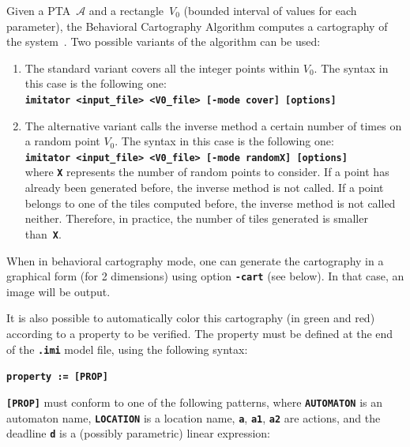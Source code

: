 \documentclass[a4paper,11pt]{report}
\newcommand{\A}{\mathcal{A}}
\newcommand{\imitatorExec}{\code{imitator}}
\newcommand{\code}[1]{\textbf{\texttt{#1}}}
\begin{document}
Given a PTA~$\A$ and a rectangle~$V_0$ (bounded interval of values for each parameter), the Behavioral Cartography Algorithm computes a cartography of the system~\cite{AF10}.
Two possible variants of the algorithm can be used:
\begin{enumerate}
	\item The standard variant covers all the integer points within $V_0$.
	The syntax in this case is the following one:\\
	\code{\imitatorExec{} <input\_file> <V0\_file> [-mode cover] [options]}

	\item The alternative variant calls the inverse method a certain number of times on a random point $V_0$.
	The syntax in this case is the following one:\\
	\code{\imitatorExec{} <input\_file> <V0\_file> [-mode randomX] [options]}\\
	where \code{X} represents the number of random points to consider.
	If a point has already been generated before, the inverse method is not called.
	If a point belongs to one of the tiles computed before, the inverse method is not called neither.
	Therefore, in practice, the number of tiles generated is smaller than~\code{X}.
\end{enumerate}

When in behavioral cartography mode, one can generate the cartography in a graphical form (for 2 dimensions) using option \code{-cart} (see below).
In that case, an image will be output.

It is also possible to automatically color this cartography (in green and red) according to a property to be verified.
The property must be defined at the end of the \code{.imi} model file, using the following syntax:

\code{property := [PROP]}

\code{[PROP]} must conform to one of the following patterns, where \code{AUTOMATON} is an automaton name, \code{LOCATION} is a location name, \code{a}, \code{a1}, \code{a2} are actions, and the deadline \code{d} is a (possibly parametric) linear expression:
\end{document}

